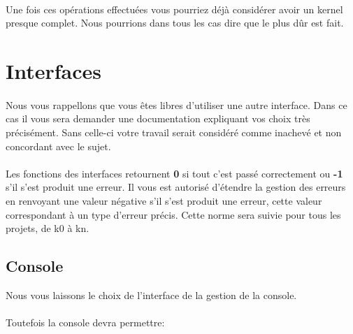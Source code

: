 \documentclass[10pt,a4wide]{article}
\begin{document}
\paragraph{}

Une fois ces op\'erations effectu\'ees vous pourriez d\'ej\`a consid\'erer
avoir un kernel presque complet. Nous pourrions dans tous les cas dire
que le plus d\^ur est fait.

\section{Interfaces}

\paragraph{}

Nous vous rappellons que vous \^etes libres d'utiliser une autre
interface. Dans ce cas il vous sera demander une documentation expliquant
vos choix tr\`es pr\'ecis\'ement. Sans celle-ci votre travail serait
consid\'er\'e comme inachev\'e et non concordant avec le sujet.

\paragraph{}

Les fonctions des interfaces retournent \textbf{0} si tout c'est
pass\'e correctement ou \textbf{-1} s'il s'est produit une erreur.
Il vous est autoris\'e d'\'etendre la gestion des erreurs en
renvoyant une valeur n\'egative s'il s'est produit une erreur,
cette valeur correspondant \`a un type d'erreur pr\'ecis. Cette norme
sera suivie pour tous les projets, de k0 \`a kn.

\subsection{Console}

Nous vous laissons le choix de l'interface de la gestion de la console.

\paragraph{}

Toutefois la console devra permettre:
\end{document}
